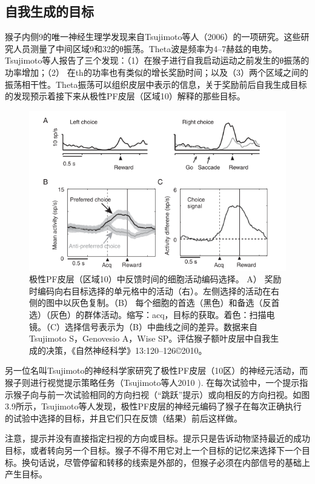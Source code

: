 \subsection{自我生成的目标}
猴子内侧9的唯一神经生理学发现来自Tsujimoto等人（2006）的一项研究。这些研究人员测量了中间区域9和32的θ振荡。Theta波是频率为4–7赫兹的电势。Tsujimoto等人报告了三个发现：（1）在猴子进行自我启动运动之前发生的θ振荡的功率增加；（2） 在th的功率也有类似的增长奖励时间；以及（3）两个区域之间的振荡相干性。Theta振荡可以组织皮层中表示的信息，关于奖励前后自我生成目标的发现预示着接下来从极性PF皮层（区域10）解释的那些目标。\par
\begin{figure}[!htb]
	\centering
	\includegraphics{image_pfc/Fig_3_9}
	\caption{极性PF皮层（区域10）中反馈时间的细胞活动编码选择。
		A） 奖励时编码向右目标选择的单元格中的活动（右）。左侧选择的活动在右侧的图中以灰色复制。（B） 每个细胞的首选（黑色）和备选（反首选）（灰色）的群体活动。缩写：acq，目标的获取。着色：扫描电镜。（C）选择信号表示为（B）中曲线之间的差异。数据来自Tsujimoto S，Genovesio A，Wise SP。评估猴子额叶皮层中自我生成的决策，《自然神经科学》13:120–126©2010。}
	\label{fig:fig}
\end{figure}
另一位名叫Tsujimoto的神经科学家研究了极性PF皮层（10区）的神经元活动，而猴子则进行视觉提示策略任务（Tsujimoto等人2010 ). 在每次试验中，一个提示指示猴子向与前一次试验相同的方向扫视（“跳跃”提示）或向相反的方向扫视。如图3.9所示，Tsujimoto等人发现，极性PF皮层的神经元编码了猴子在每次正确执行的试验中选择的目标，并且它们只在反馈（结果）前后这样做。\par
注意，提示并没有直接指定扫视的方向或目标。提示只是告诉动物坚持最近的成功目标，或者转向另一个目标。猴子不得不用它对上一个目标的记忆来选择下一个目标。换句话说，尽管停留和转移的线索是外部的，但猴子必须在内部信号的基础上产生目标。\par
